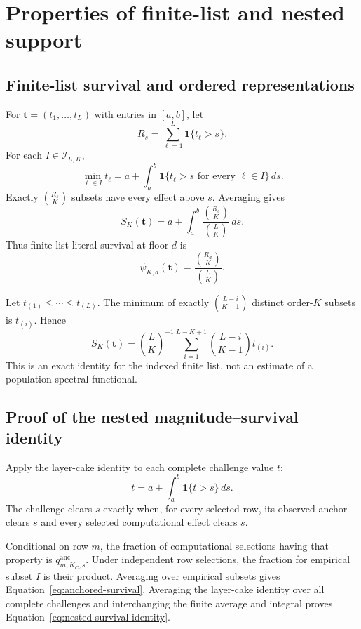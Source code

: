 \documentclass[11pt]{article}
\theoremstyle{remark}
\begin{document}
\section{Properties of finite-list and nested support}
\label{app:support-proofs}

\subsection{Finite-list survival and ordered representations}

For $\mathbf t=(t_1,\ldots,t_L)$ with entries in $[a,b]$, let
\[
R_s=\sum_{\ell=1}^L\mathbf 1\{t_\ell>s\}.
\]
For each $I\in\mathcal I_{L,K}$,
\[
\min_{\ell\in I}t_\ell
=
a+\int_a^b
\mathbf 1\{t_\ell>s\text{ for every }\ell\in I\}\,ds.
\]
Exactly $\binom{R_s}{K}$ subsets have every effect above $s$. Averaging gives
\begin{equation}
S_K(\mathbf t)
=
a+\int_a^b
\frac{\binom{R_s}{K}}{\binom{L}{K}}\,ds.
\label{eq:finite-survival}
\end{equation}
Thus finite-list literal survival at floor $d$ is
\begin{equation}
\psi_{K,d}(\mathbf t)
=
\frac{\binom{R_d}{K}}{\binom{L}{K}}.
\label{eq:finite-literal}
\end{equation}

Let $t_{(1)}\leq\cdots\leq t_{(L)}$. The minimum of exactly
$\binom{L-i}{K-1}$ distinct order-$K$ subsets is $t_{(i)}$. Hence
\begin{equation}
S_K(\mathbf t)
=
\binom{L}{K}^{-1}
\sum_{i=1}^{L-K+1}
\binom{L-i}{K-1}t_{(i)}.
\label{eq:finite-ordered}
\end{equation}
This is an exact identity for the indexed finite list, not an estimate of a
population spectral functional.

\subsection{Proof of the nested magnitude--survival identity}

Apply the layer-cake identity to each complete challenge value $t$:
\[
t
=
a+\int_a^b\mathbf 1\{t>s\}\,ds.
\]
The challenge clears $s$ exactly when, for every selected row, its observed
anchor clears $s$ and every selected computational effect clears $s$.

Conditional on row $m$, the fraction of computational selections having that
property is $q^{\mathrm{anc}}_{m,K_C,s}$. Under independent row selections, the
fraction for empirical subset $I$ is their product. Averaging over empirical
subsets gives Equation~\eqref{eq:anchored-survival}. Averaging the layer-cake
identity over all complete challenges and interchanging the finite average and
integral proves Equation~\eqref{eq:nested-survival-identity}.
\end{document}
